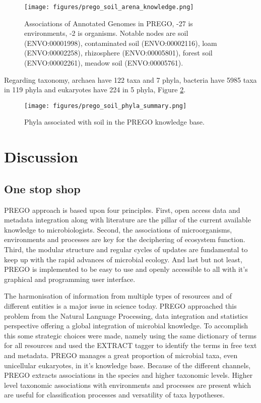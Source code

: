    \begin{figure}[hbt!]
      \centering
      \texttt{[image: figures/prego\_soil\_arena\_knowledge.png]}
      \caption[PREGO soil network of associations of annotated genomes]{
         Associations of Annotated Genomes in PREGO, -27 is environments, -2 is organisms. Notable nodes are soil (ENVO:00001998), contaminated soil (ENVO:00002116), loam (ENVO:00002258), rhizosphere (ENVO:00005801), forest soil (ENVO:00002261), meadow soil (ENVO:00005761).}
      \label{fig:prego-soil-network_k}
   \end{figure}

Regarding taxonomy, archaea have 122 taxa and 7 phyla, bacteria have 5985 taxa
in 119 phyla and eukaryotes have 224 in 5 phyla, Figure \ref{fig:prego-soil-phyla}.

   \begin{figure}[hbt!]
      \centering
      \texttt{[image: figures/prego\_soil\_phyla\_summary.png]}
      \caption[PREGO soil taxonomy summary]{
         Phyla associated with soil in the PREGO knowledge base.}
      \label{fig:prego-soil-phyla}
   \end{figure}


\section{Discussion}
\label{sec:prego-discussion}

   \subsection{One stop shop}
   \label{subsec:prego-contents-disc}

PREGO approach is based upon four principles. First, open access data and
metadata integration along with literature are the pillar of the current
available knowledge to microbiologists. Second, the associations of microorganisms,
environments and processes are key for the deciphering of ecosystem function.
Third, the modular structure and regular cycles of updates are fundamental to
keep up with the rapid advances of microbial ecology. And last but not least,
PREGO is implemented to be easy to use and openly accessible to all with it’s graphical and programming user interface.

The harmonisation of information from multiple types of resources and of different
entities is a major issue in science today. PREGO approached this problem from 
the Natural Language Processing, data integration and statistics perspective offering a global integration 
of microbial knowledge. To accomplish this some strategic choices were made, 
namely using the same dictionary of terms for all resources and used 
the EXTRACT tagger to identify the terms in free text and metadata.
PREGO manages a great proportion of microbial taxa, even unicellular eukaryotes, in it's knowledge base.
Because of the different channels, PREGO extracts associations in the species and higher taxonomic levels.
Higher level taxonomic associations with environments and processes are present
which are useful for classification processes and versatility of taxa hypotheses.

